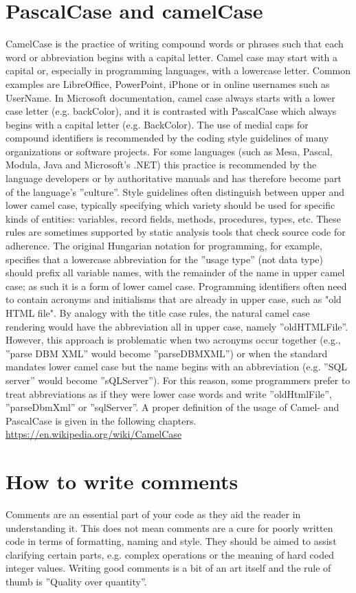 \section{PascalCase and camelCase}
CamelCase is the practice of writing compound words or phrases such that each word or abbreviation begins with a capital letter. Camel case may start with a capital or, especially in programming languages, with a lowercase letter. Common examples are LibreOffice, PowerPoint, iPhone or in online usernames such as UserName.
In Microsoft documentation, camel case always starts with a lower case letter (e.g. backColor), and it is contrasted with PascalCase which always begins with a capital letter (e.g. BackColor).
The use of medial caps for compound identifiers is recommended by the coding style guidelines of many organizations or software projects. For some languages (such as Mesa, Pascal, Modula, Java and Microsoft's .NET) this practice is recommended by the language developers or by authoritative manuals and has therefore become part of the language's ''culture''.
Style guidelines often distinguish between upper and lower camel case, typically specifying which variety should be used for specific kinds of entities: variables, record fields, methods, procedures, types, etc. These rules are sometimes supported by static analysis tools that check source code for adherence.
The original Hungarian notation for programming, for example, specifies that a lowercase abbreviation for the ''usage type'' (not data type) should prefix all variable names, with the remainder of the name in upper camel case; as such it is a form of lower camel case.
Programming identifiers often need to contain acronyms and initialisms that are already in upper case, such as "old HTML file". By analogy with the title case rules, the natural camel case rendering would have the abbreviation all in upper case, namely ''oldHTMLFile''. However, this approach is problematic when two acronyms occur together (e.g., ''parse DBM XML'' would become ''parseDBMXML'') or when the standard mandates lower camel case but the name begins with an abbreviation (e.g. ''SQL server'' would become ''sQLServer''). For this reason, some programmers prefer to treat abbreviations as if they were lower case words and write ''oldHtmlFile'', ''parseDbmXml'' or ''sqlServer''.
A proper definition of the usage of Camel- and PascalCase is given in the following chapters.
\url{https://en.wikipedia.org/wiki/CamelCase}

\section{How to write comments}
Comments are an essential part of your code as they aid the reader in understanding it. This does not mean comments are a cure for poorly written code in terms of formatting, naming and style. They should be aimed to assist clarifying certain parts, e.g. complex operations or the meaning of hard coded integer values. Writing good comments is a bit of an art itself and the rule of thumb is ''Quality over quantity''.

